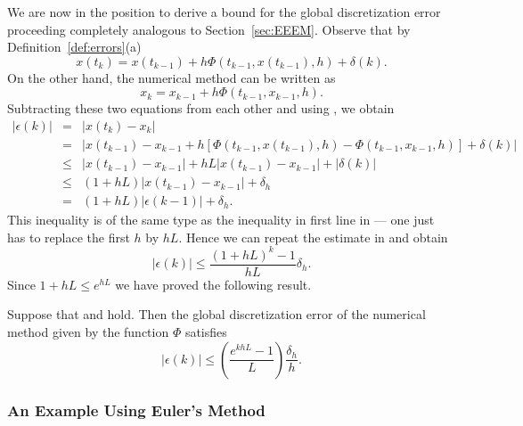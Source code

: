 \documentclass{ximera}
\begin{document}
We are now in the position to derive a bound for the global 
discretization error proceeding completely analogous to 
Section~\ref{sec:EEEM}.   Observe that by 
Definition~\ref{def:errors}(a)
\[
x(t_k) =  x(t_{k-1}) + h\Phi(t_{k-1},x(t_{k-1}),h)+\delta(k).
\]
On the other hand, the numerical method can be written as
\[
x_k = x_{k-1} + h\Phi(t_{k-1},x_{k-1},h).
\]
Subtracting these two equations from each other and using ,
 we obtain
\begin{eqnarray*}
|\epsilon(k)| &=& |x(t_k)-x_k|\\
&=& |x(t_{k-1})-x_{k-1} + h[\Phi(t_{k-1},x(t_{k-1}),h)-
\Phi(t_{k-1},x_{k-1},h)]
+\delta(k)|\\
&\le& |x(t_{k-1})-x_{k-1}|+hL|x(t_{k-1})-x_{k-1}|+|\delta(k)|\\
&\le& (1+hL)|x(t_{k-1})-x_{k-1}|+\delta_h\\
&=& (1+hL)|\epsilon(k-1)|+\delta_h.
\end{eqnarray*}
This inequality is of the same type as the inequality in first line in
 --- one just has to replace the first $h$ by $hL$.
Hence we can repeat the estimate in  and obtain
\[
|\epsilon(k)| \le \frac{(1+hL)^k -1}{hL}\delta_h.
\]
Since $1+hL\le e^{hL}$ we have proved the following result.
\begin{thm} \label{prop:glerr}
Suppose that  and  hold.  Then the
global discretization error of the numerical method given
by the function $\Phi$ satisfies 
\begin{equation} \label{eq:geestimate}
|\epsilon(k)| \le \left(\frac{e^{khL}-1}{L}\right)\frac{\delta_h}{h}.
\end{equation}
\end{thm}

\subsubsection*{An Example Using Euler's Method}
\end{document}
